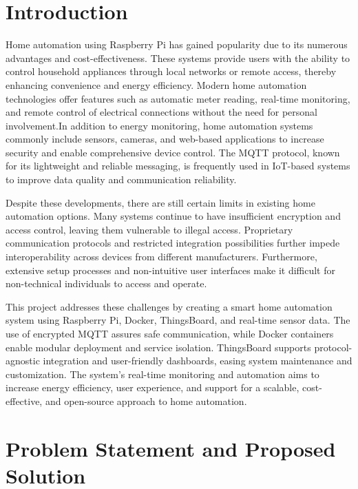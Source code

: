 \documentclass[a4paper,12pt]{report}
\begin{document}
\tableofcontents
\listoffigures
\newpage

\chapter{Introduction}

Home automation using Raspberry Pi has gained popularity due to its numerous advantages and cost-effectiveness. These systems provide users with the ability to control household appliances through local networks or remote access, thereby enhancing convenience and energy efficiency\cite{jain2014raspberry}. Modern home automation technologies offer features such as automatic meter reading, real-time monitoring, and remote control of electrical connections without the need for personal involvement\cite{chaudhari2017smart}.In addition to energy monitoring, home automation systems commonly include sensors, cameras, and web-based applications to increase security and enable comprehensive device control\cite{patchava2015smart}. The MQTT protocol, known for its lightweight and reliable messaging, is frequently used in IoT-based systems to improve data quality and communication reliability\cite{Atmoko_2017}.

Despite these developments, there are still certain limits in existing home automation options.  Many systems continue to have insufficient encryption and access control, leaving them vulnerable to illegal access.  Proprietary communication protocols and restricted integration possibilities further impede interoperability across devices from different manufacturers.  Furthermore, extensive setup processes and non-intuitive user interfaces make it difficult for non-technical individuals to access and operate.

This project addresses these challenges by creating a smart home automation system using Raspberry Pi, Docker, ThingsBoard, and real-time sensor data.  The use of encrypted MQTT assures safe communication, while Docker containers enable modular deployment and service isolation.  ThingsBoard supports protocol-agnostic integration and user-friendly dashboards, easing system maintenance and customization.  The system's real-time monitoring and automation aims to increase energy efficiency, user experience, and support for a scalable, cost-effective, and open-source approach to home automation.


\chapter{Problem Statement and Proposed Solution}
\end{document}
